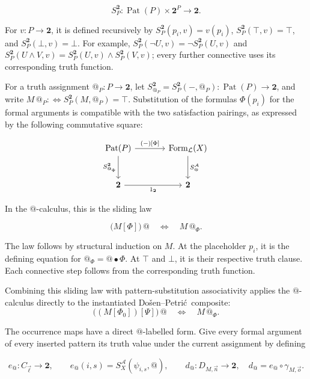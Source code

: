 \documentclass[11pt]{article}
\makeatletter
\newcommand{\atsign}{\mathord{@}}
\newcommand{\DP}{Do\v{s}en--Petri\'{c}}
\theoremstyle{definition}
\makeatother
\begin{document}
\[
S_P^{\mathbf 2}:\operatorname{Pat}(P)\times\mathbf 2^P
\longrightarrow\mathbf 2.
\]

For \(v:P\to\mathbf2\), it is defined recursively by
\(S_P^{\mathbf2}(p_i,v)=v(p_i)\),
\(S_P^{\mathbf2}(\top,v)=\top\), and
\(S_P^{\mathbf2}(\bot,v)=\bot\). For example,
\(S_P^{\mathbf2}(\neg U,v)=\neg S_P^{\mathbf2}(U,v)\) and
\(S_P^{\mathbf2}(U\wedge V,v)=
S_P^{\mathbf2}(U,v)\wedge S_P^{\mathbf2}(V,v)\); every further connective
uses its corresponding truth function.

For a truth assignment \(\atsign_P:P\to\mathbf 2\), let
\(S_{\atsign_P}^{\mathbf 2}=S_P^{\mathbf 2}(-,\atsign_P):
\operatorname{Pat}(P)\to\mathbf 2\), and write
\(M\,\atsign_P:\!\Longleftrightarrow
S_P^{\mathbf 2}(M,\atsign_P)=\top\). Substitution of
the formulas \(\Phi(p_i)\) for the formal arguments is compatible with the two
satisfaction pairings, as expressed by the following commutative square:

\[
\begin{tikzcd}[row sep=large,column sep=large]
\operatorname{Pat}(P) \arrow[r,"{(-)[\Phi]}"]
  \arrow[d,"S_{\atsign_\Phi}^{\mathbf 2}"'] &
\operatorname{Form}_{\mathcal L}(X)
  \arrow[d,"S_{\atsign}^{\mathcal A}"] \\
\mathbf 2 \arrow[r,"1_{\mathbf 2}"'] & \mathbf 2
\end{tikzcd}
\]

In the \(\atsign\)-calculus, this is the sliding law

\[
\boxed{
\bigl(M[\Phi]\bigr)\,\atsign
\quad\Longleftrightarrow\quad
M\,\atsign_\Phi.
}
\]

The law follows by structural induction on \(M\). At the placeholder
\(p_i\), it is the defining equation for
\(\atsign_\Phi=\atsign\mathbin\bullet\Phi\). At \(\top\) and \(\bot\), it is their
respective truth clause. Each connective step follows from the corresponding
truth function.

Combining this sliding law with pattern-substitution associativity applies the
\(\atsign\)-calculus directly to the instantiated \DP\ composite:
\[
\boxed{
\bigl((M[\Phi_0])[\Psi]\bigr)\,\atsign
\quad\Longleftrightarrow\quad
M\,\atsign_\Phi.
}
\]

The occurrence maps have a direct \(\atsign\)-labelled form. Give every
formal argument of every inserted pattern its truth value under the current
assignment by defining

\[
e_{\atsign}:C_{\vec\ell}\longrightarrow\mathbf 2,
\qquad
e_{\atsign}(i,s)=S_X^{\mathcal A}(\psi_{i,s},\atsign),
\qquad
d_{\atsign}:D_{M,\vec n}\longrightarrow\mathbf 2,
\quad d_{\atsign}=e_{\atsign}\circ\gamma_{M,\vec o}.
\]
\end{document}
